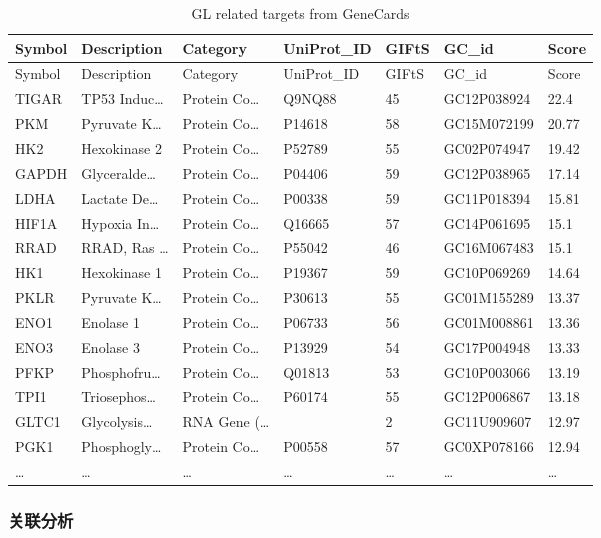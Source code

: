 \documentclass[
]{article}
\begin{document}
\begin{longtable}[]{@{}lllllll@{}}
\caption{\label{tab:GL-related-targets-from-GeneCards}GL related targets from GeneCards}\tabularnewline
\toprule
Symbol & Description & Category & UniProt\_ID & GIFtS & GC\_id & Score\tabularnewline
\midrule
\endfirsthead
\toprule
Symbol & Description & Category & UniProt\_ID & GIFtS & GC\_id & Score\tabularnewline
\midrule
\endhead
TIGAR & TP53 Induc\ldots{} & Protein Co\ldots{} & Q9NQ88 & 45 & GC12P038924 & 22.4\tabularnewline
PKM & Pyruvate K\ldots{} & Protein Co\ldots{} & P14618 & 58 & GC15M072199 & 20.77\tabularnewline
HK2 & Hexokinase 2 & Protein Co\ldots{} & P52789 & 55 & GC02P074947 & 19.42\tabularnewline
GAPDH & Glyceralde\ldots{} & Protein Co\ldots{} & P04406 & 59 & GC12P038965 & 17.14\tabularnewline
LDHA & Lactate De\ldots{} & Protein Co\ldots{} & P00338 & 59 & GC11P018394 & 15.81\tabularnewline
HIF1A & Hypoxia In\ldots{} & Protein Co\ldots{} & Q16665 & 57 & GC14P061695 & 15.1\tabularnewline
RRAD & RRAD, Ras \ldots{} & Protein Co\ldots{} & P55042 & 46 & GC16M067483 & 15.1\tabularnewline
HK1 & Hexokinase 1 & Protein Co\ldots{} & P19367 & 59 & GC10P069269 & 14.64\tabularnewline
PKLR & Pyruvate K\ldots{} & Protein Co\ldots{} & P30613 & 55 & GC01M155289 & 13.37\tabularnewline
ENO1 & Enolase 1 & Protein Co\ldots{} & P06733 & 56 & GC01M008861 & 13.36\tabularnewline
ENO3 & Enolase 3 & Protein Co\ldots{} & P13929 & 54 & GC17P004948 & 13.33\tabularnewline
PFKP & Phosphofru\ldots{} & Protein Co\ldots{} & Q01813 & 53 & GC10P003066 & 13.19\tabularnewline
TPI1 & Triosephos\ldots{} & Protein Co\ldots{} & P60174 & 55 & GC12P006867 & 13.18\tabularnewline
GLTC1 & Glycolysis\ldots{} & RNA Gene (\ldots{} & & 2 & GC11U909607 & 12.97\tabularnewline
PGK1 & Phosphogly\ldots{} & Protein Co\ldots{} & P00558 & 57 & GC0XP078166 & 12.94\tabularnewline
\ldots{} & \ldots{} & \ldots{} & \ldots{} & \ldots{} & \ldots{} & \ldots{}\tabularnewline
\bottomrule
\end{longtable}

\begin{center}\vspace{1.5cm}\end{center}

\hypertarget{ux5173ux8054ux5206ux6790}{%
\subsubsection{关联分析}\label{ux5173ux8054ux5206ux6790}}

\begin{center}\vspace{1.5cm}\end{center}
\end{document}
